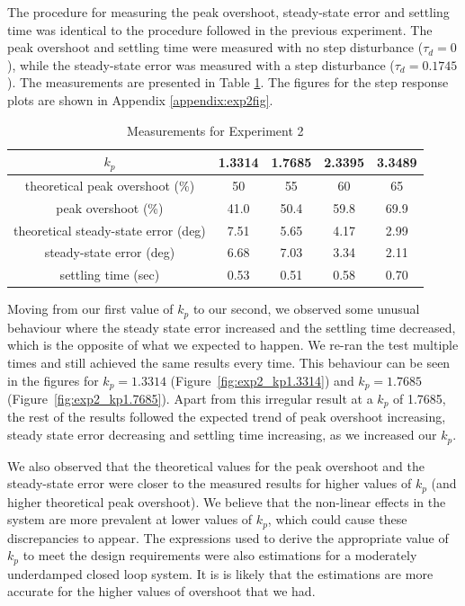 \documentclass[12pt]{article}
\begin{document}
The procedure for measuring the peak overshoot, steady-state error and settling time was identical to the procedure followed in the previous experiment. The peak overshoot and settling time were measured with no step disturbance ($\tau_d = 0$), while the steady-state error was measured with a step disturbance ($\tau_d = 0.1745$). The measurements are presented in Table \ref{table:exp2_measurements}. The figures for the step response plots are shown in Appendix \ref{appendix:exp2fig}.

\begin{table}[h!]
\centering
\begin{tabular}{|c|c|c|c|c|} \hline
    $k_p$ & 1.3314 & 1.7685 & 2.3395 & 3.3489 \\ \hline
    theoretical peak overshoot (\%) & 50 & 55 & 60 & 65 \\ \hline
    peak overshoot (\%) & 41.0 & 50.4 & 59.8 & 69.9 \\ \hline
    theoretical steady-state error (deg) & 7.51 & 5.65 & 4.17 & 2.99 \\ \hline
    steady-state error (deg) & 6.68 & 7.03 & 3.34 & 2.11 \\ \hline
    settling time (sec) & 0.53 & 0.51 & 0.58 & 0.70 \\ \hline 
\end{tabular}
\caption{\label{table:exp2_measurements}Measurements for Experiment 2}
\end{table}

Moving from our first value of $k_p$ to our second, we observed some unusual behaviour where the steady state error increased and the settling time decreased, which is the opposite of what we expected to happen. We re-ran the test multiple times and still achieved the same results every time. This behaviour can be seen in the figures for $k_p = 1.3314$ (Figure~\ref{fig:exp2_kp1.3314}) and $k_p = 1.7685$ (Figure~\ref{fig:exp2_kp1.7685}). Apart from this irregular result at a $k_p$ of 1.7685, the rest of the results followed the expected trend of peak overshoot increasing, steady state error decreasing and settling time increasing, as we increased our $k_p$.

We also observed that the theoretical values for the peak overshoot and the steady-state error were closer to the measured results for higher values of $k_p$ (and higher theoretical peak overshoot). We believe that the non-linear effects in the system are more prevalent at lower values of $k_p$, which could cause these discrepancies to appear. The expressions used to derive the appropriate value of $k_p$ to meet the design requirements were also estimations for a moderately underdamped closed loop system. It is is likely that the estimations are more accurate for the higher values of overshoot that we had.
\end{document}
